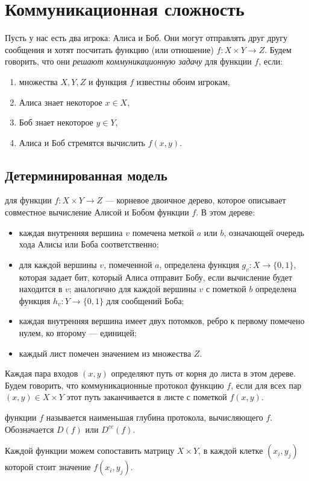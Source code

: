 \chapter{Коммуникационная сложность}
Пусть у нас есть два игрока: Алиса и Боб. Они могут отправлять друг другу сообщения и хотят посчитать функцию (или отношение) $ f \colon X \times Y \to Z$.
Будем говорить, что они \textit{решают коммуникационную задачу} для функции $ f$, если:
\begin{enumerate}
	\item множества $ X, Y, Z$ и функция $ f$ известны обоим игрокам,
	\item	Алиса знает некоторое $x \in  X$,
	\item	Боб знает некоторое $ y \in Y$,
	\item	Алиса и Боб стремятся вычислить $ f(x, y)$.
\end{enumerate}

\section{Детерминированная модель}
\begin{defn}
	 для функции $ f\colon X\times Y \to  Z$ --- корневое двоичное дерево, которое описывает совместное вычисление Алисой и Бобом функции $ f$. В этом дереве:
	   \begin{itemize}
		   \item каждая внутренняя вершина $ v$ помечена меткой $ a$ или $ b$, означающей очередь хода Алисы или Боба соответственно;
		   \item для каждой вершины $ v$, помеченной $ a$, определена функция  $ g_v\colon X \to \{0, 1\}$, которая задает бит, который Алиса отправит  Бобу, если вычисление будет находится в $ v$; аналогично для каждой вершины $ v$ с пометкой $ b$ определена функция  $ h_v\colon Y \to \{0, 1\}$ для сообщений Боба;
		\item каждая внутренняя вершина имеет двух потомков, ребро к первому помечено нулем, ко второму --- единицей;
		\item каждый лист помечен значением из множества $ Z$.
	   \end{itemize}
	   Каждая пара входов $ (x, y)$ определяют путь от корня до листа в этом дереве. 
	   Будем  говорить, что коммуникационные протокол  функцию $ f$, если для всех пар  $ (x, y) \in  X \times Y$ этот путь заканчивается в листе с пометкой $ f(x, y)$.

	    функции $ f$ называется наименьшая глубина протокола, вычисляющего  $ f$. Обозначается  $ D(f)$ или $ D^{cc}(f)$.

	   Каждой функции можем сопоставить матрицу  $ X \times Y$, в каждой клетке $ (x_i, y_j)$ которой стоит значение  $ f(x_i, y_j)$.
\end{defn}

